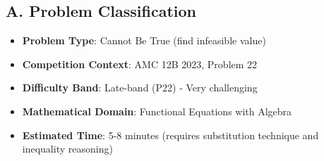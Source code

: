 \documentclass[12pt]{article}
\begin{document}
\begin{problemconfigbox}
\subsection*{A. Problem Classification}
\begin{itemize}[leftmargin=*]
    \item \textbf{Problem Type}: Cannot Be True (find infeasible value)
    \item \textbf{Competition Context}: AMC 12B 2023, Problem 22
    \item \textbf{Difficulty Band}: Late-band (P22) - Very challenging
    \item \textbf{Mathematical Domain}: Functional Equations with Algebra
    \item \textbf{Estimated Time}: 5-8 minutes (requires substitution technique and inequality reasoning)
\end{itemize}


\end{problemconfigbox}
\end{document}
